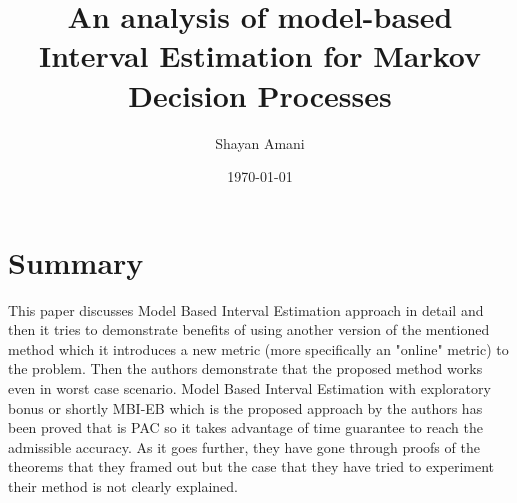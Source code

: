 \documentclass[a4paper,12pt]{article}
\title{An analysis of model-based Interval Estimation for Markov Decision Processes}
\author{Shayan Amani}
\date{\today}
\begin{document}
\maketitle

\section{Summary}
This paper discusses Model Based Interval Estimation approach in detail and then it tries to demonstrate benefits of using another version of the mentioned method which it introduces a new metric (more specifically an "online" metric) to the problem. Then the authors demonstrate that the proposed method works even in worst case scenario. Model Based Interval Estimation with exploratory bonus or shortly MBI-EB which is the proposed approach by the authors has been proved that is PAC so it takes advantage of time guarantee to reach the  admissible accuracy. As it goes further, they have gone through proofs of the theorems that they framed out but the case that they have tried to experiment their method is not clearly explained.









\end{document}
